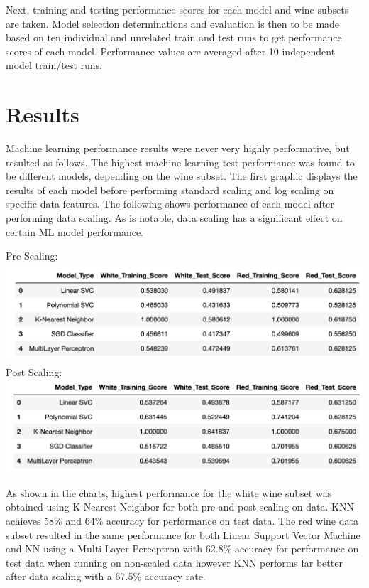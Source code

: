 \documentclass[titlepage]{article}
\begin{document}
		Next, training and testing performance scores for each model and wine subsets are taken.  Model selection determinations and evaluation is then to be made based on ten individual and unrelated train and test runs to get performance scores of each model.  Performance values are averaged after 10 independent model train/test runs.  
	 
	\section*{Results}
	Machine learning performance results were never very highly performative, but resulted as follows.  The highest machine learning test performance was found to be different models, depending on the wine subset.  The first graphic displays the results of each model before performing standard scaling and log scaling on specific data features.  The following shows performance of each model after performing data scaling.  As is notable, data scaling has a significant effect on certain ML model performance.  
	\begin{center}
		Pre Scaling:
		 \newline \includegraphics[width=.8\textwidth]{img/results.png}
		 \newline Post Scaling:
		 \newline \includegraphics[width=.8\textwidth]{img/postscaleresults2.png}
	\end{center}
	
As shown in the charts, highest performance for the white wine subset was obtained using K-Nearest Neighbor for both pre and post scaling on data. KNN achieves 58\% and 64\% accuracy for performance on test data.  The red wine data subset resulted in the same performance for both Linear Support Vector Machine and NN using a Multi Layer Perceptron with 62.8\% accuracy for performance on test data when running on non-scaled data however KNN performs far better after data scaling with a 67.5\% accuracy rate.
\end{document}
